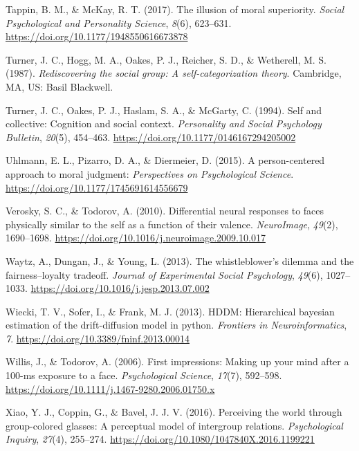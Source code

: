 \documentclass[
  english,
  man]{apa6}
\begin{document}
\leavevmode\hypertarget{ref-tappin_illusion_2017}{}%
Tappin, B. M., \& McKay, R. T. (2017). The illusion of moral superiority. \emph{Social Psychological and Personality Science}, \emph{8}(6), 623--631. \url{https://doi.org/10.1177/1948550616673878}

\leavevmode\hypertarget{ref-turner_rediscovering_1987}{}%
Turner, J. C., Hogg, M. A., Oakes, P. J., Reicher, S. D., \& Wetherell, M. S. (1987). \emph{Rediscovering the social group: A self-categorization theory}. Cambridge, MA, US: Basil Blackwell.

\leavevmode\hypertarget{ref-turner_self_1994}{}%
Turner, J. C., Oakes, P. J., Haslam, S. A., \& McGarty, C. (1994). Self and collective: Cognition and social context. \emph{Personality and Social Psychology Bulletin}, \emph{20}(5), 454--463. \url{https://doi.org/10.1177/0146167294205002}

\leavevmode\hypertarget{ref-uhlmann_person-centered_2015}{}%
Uhlmann, E. L., Pizarro, D. A., \& Diermeier, D. (2015). A person-centered approach to moral judgment: \emph{Perspectives on Psychological Science}. \url{https://doi.org/10.1177/1745691614556679}

\leavevmode\hypertarget{ref-verosky_differential_2010}{}%
Verosky, S. C., \& Todorov, A. (2010). Differential neural responses to faces physically similar to the self as a function of their valence. \emph{NeuroImage}, \emph{49}(2), 1690--1698. \url{https://doi.org/10.1016/j.neuroimage.2009.10.017}

\leavevmode\hypertarget{ref-waytz_whistleblowers_2013}{}%
Waytz, A., Dungan, J., \& Young, L. (2013). The whistleblower's dilemma and the fairness--loyalty tradeoff. \emph{Journal of Experimental Social Psychology}, \emph{49}(6), 1027--1033. \url{https://doi.org/10.1016/j.jesp.2013.07.002}

\leavevmode\hypertarget{ref-wiecki_hddm_2013}{}%
Wiecki, T. V., Sofer, I., \& Frank, M. J. (2013). HDDM: Hierarchical bayesian estimation of the drift-diffusion model in python. \emph{Frontiers in Neuroinformatics}, \emph{7}. \url{https://doi.org/10.3389/fninf.2013.00014}

\leavevmode\hypertarget{ref-willis_first_2006}{}%
Willis, J., \& Todorov, A. (2006). First impressions: Making up your mind after a 100-ms exposure to a face. \emph{Psychological Science}, \emph{17}(7), 592--598. \url{https://doi.org/10.1111/j.1467-9280.2006.01750.x}

\leavevmode\hypertarget{ref-xiao_perceiving_2016}{}%
Xiao, Y. J., Coppin, G., \& Bavel, J. J. V. (2016). Perceiving the world through group-colored glasses: A perceptual model of intergroup relations. \emph{Psychological Inquiry}, \emph{27}(4), 255--274. \url{https://doi.org/10.1080/1047840X.2016.1199221}

\endgroup
\end{document}
